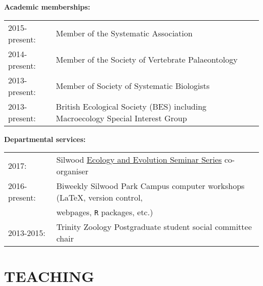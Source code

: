 \documentclass[10pt,a4paper]{article}
\begin{document}
{\bigskip


\bigskip

\raggedright\textbf{Academic memberships:}
\begin{tabular}{ll}
2015-present: & Member of the Systematic Association\\ 
2014-present: & Member of the Society of Vertebrate Palaeontology\\
2013-present: & Member of Society of Systematic Biologists\\
2013-present: & British Ecological Society (BES) including Macroecology Special Interest Group\\
\end{tabular}
\bigskip

\raggedright\textbf{Departmental services:}
\begin{tabular}{ll}
2017: & Silwood \href{http://www.imperial.ac.uk/silwood-park/research/thursday-seminars/}{Ecology and Evolution Seminar Series} co-organiser\\
2016-present: & Biweekly Silwood Park Campus computer workshops (\LaTeX, version control,\\
& webpages, \texttt{R} packages, etc.) \\
2013-2015: & Trinity Zoology Postgraduate student social committee chair \\
\end{tabular}
\bigskip


\section{TEACHING}
\bigskip

}
\end{document}
